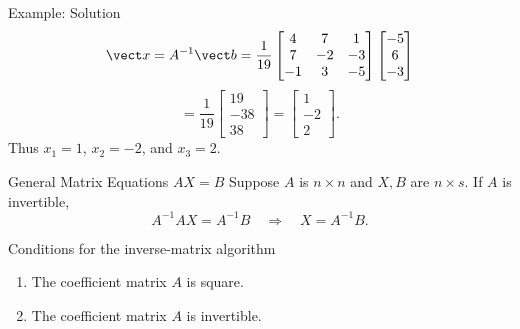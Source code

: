\begin{frame}{Example: Solution}
\[
\vect x=A^{-1}\vect b
=\frac1{19}
\begin{bmatrix}
4&7&1\\7&-2&-3\\-1&3&-5
\end{bmatrix}
\begin{bmatrix}-5\\6\\-3\end{bmatrix}
\]
\pause
\[
=\frac1{19}\begin{bmatrix}19\\-38\\38\end{bmatrix}
=\begin{bmatrix}1\\-2\\2\end{bmatrix}.
\]
Thus $x_1=1$, $x_2=-2$, and $x_3=2$.
\end{frame}

\begin{frame}{General Matrix Equations $AX=B$}
Suppose $A$ is $n\times n$ and $X,B$ are $n\times s$. If $A$ is invertible,
\[
A^{-1}AX=A^{-1}B
\quad\Longrightarrow\quad
\boxed{X=A^{-1}B}.
\]
\begin{block}{Conditions for the inverse-matrix algorithm}
\begin{enumerate}
  \item The coefficient matrix $A$ is square.
  \item The coefficient matrix $A$ is invertible.
\end{enumerate}
\end{block}
\end{frame}

